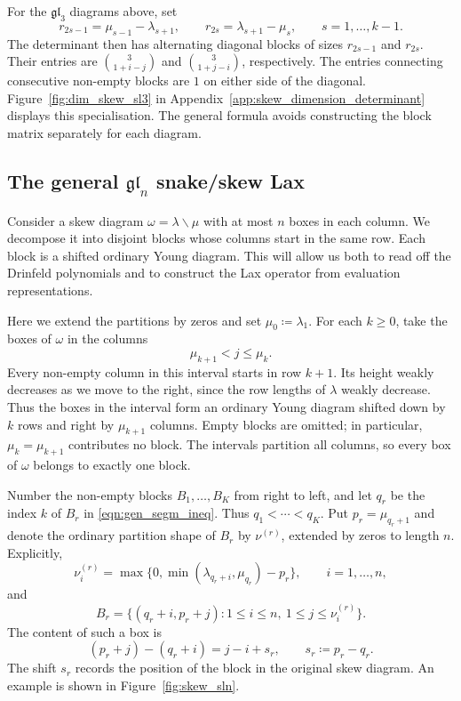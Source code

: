 \documentclass[12pt,reqno]{amsart}
\numberwithin{equation}{section}
\begin{document}
For the $\mathfrak{gl}_3$ diagrams above, set
\begin{equation*}
    r_{2s-1}=\mu_{s-1}-\lambda_{s+1},\qquad
    r_{2s}=\lambda_{s+1}-\mu_s,\qquad s=1,\ldots,k-1.
\end{equation*}
The determinant then has alternating diagonal blocks of sizes
$r_{2s-1}$ and $r_{2s}$. Their entries are
$\binom{3}{1+i-j}$ and $\binom{3}{1+j-i}$, respectively.
The entries connecting consecutive non-empty blocks are $1$
on either side of the diagonal. Figure~\ref{fig:dim_skew_sl3}
in Appendix~\ref{app:skew_dimension_determinant} displays this
specialisation. The general formula avoids constructing the
block matrix separately for each diagram.

	\subsection{The general \texorpdfstring{$\mathfrak{gl}_n$}{glₙ} snake/skew Lax}
	\label{subsec:general_skew_Lax}
	
	Consider a skew diagram $\omega=\lambda\backslash\mu$ with at most
	$n$ boxes in each column. We decompose it into disjoint blocks whose
	columns start in the same row. Each block is a shifted ordinary Young
	diagram. This will allow us both to read off the Drinfeld polynomials
	and to construct the Lax operator from evaluation representations.
	
	Here we extend the partitions by zeros and set
	$\mu_0\coloneqq\lambda_1$. For each $k\geq0$, take the boxes of
	$\omega$ in the columns
	\begin{equation}
		\mu_{k+1}<j\leq\mu_k.
		\label{eqn:gen_segm_ineq}
	\end{equation}
	Every non-empty column in this interval starts in row $k+1$.
	Its height weakly decreases as we move to the right, since the row
	lengths of $\lambda$ weakly decrease. Thus the boxes in the interval
	form an ordinary Young diagram shifted down by $k$ rows and right
	by $\mu_{k+1}$ columns. Empty blocks are omitted; in particular,
	$\mu_k=\mu_{k+1}$ contributes no block. The intervals partition all
	columns, so every box of $\omega$ belongs to exactly one block.
	
	Number the non-empty blocks $B_1,\ldots,B_K$ from right to left,
	and let $q_r$ be the index $k$ of $B_r$ in
	\eqref{eqn:gen_segm_ineq}. Thus $q_1<\cdots<q_K$.
	Put $p_r=\mu_{q_r+1}$ and denote the ordinary partition shape of
	$B_r$ by $\nu^{(r)}$, extended by zeros to length $n$. Explicitly,
	\begin{equation}
		\nu_i^{(r)}
		=\max\{0,\min(\lambda_{q_r+i},\mu_{q_r})-p_r\},
		\qquad i=1,\ldots,n,
		\label{eqn:skew_block_shape}
	\end{equation}
	and
	\begin{equation*}
		B_r=\{(q_r+i,p_r+j):1\leq i\leq n,
		\ 1\leq j\leq\nu_i^{(r)}\}.
	\end{equation*}
	The content of such a box is
	\begin{equation}
		(p_r+j)-(q_r+i)=j-i+s_r,
		\qquad s_r\coloneqq p_r-q_r.
		\label{eqn:skew_block_content_shift}
	\end{equation}
	The shift $s_r$ records the position of the block in the original
	skew diagram. An example is shown in Figure~\ref{fig:skew_sln}.
	
\end{document}
